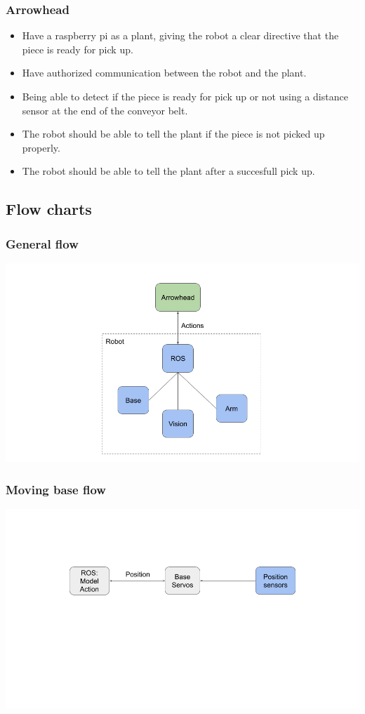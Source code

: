 \documentclass{beamer}
\begin{document}
\begin{frame}
    \frametitle{Arrowhead}
    \begin{itemize}
        \item Have a raspberry pi as a plant, giving the robot a clear directive that the piece is ready for pick up.
        \item Have authorized communication between the robot and the plant.
        \item Being able to detect if the piece is ready for pick up or not using a distance sensor at the end
        of the conveyor belt.
        \item The robot should be able to tell the plant if the piece is not picked up properly.
        \item The robot should be able to tell the plant after a succesfull pick up.
    \end{itemize}
\end{frame}

\subsection{Flow charts}
\begin{frame}
    \frametitle{General flow}
    \includegraphics[width=\textwidth]{img/general_flow.png}
\end{frame}

\begin{frame}
    \frametitle{Moving base flow}
    \includegraphics[width=\textwidth]{img/base_flow.png}
\end{frame}
\end{document}
